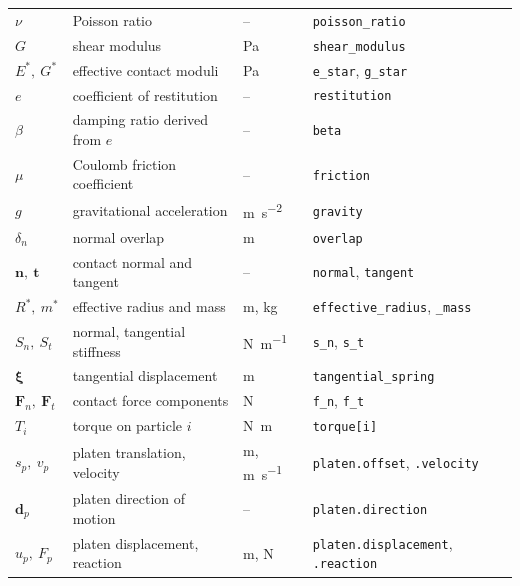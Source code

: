 \begin{table}[htbp]
\begin{tabular}{llll}
    $\nu$            & Poisson ratio                    & --                   & \texttt{poisson\_ratio} \\
    $G$              & shear modulus                    & \unit{\pascal}       & \texttt{shear\_modulus} \\
    $E^{*},\ G^{*}$  & effective contact moduli         & \unit{\pascal}       & \texttt{e\_star}, \texttt{g\_star} \\
    $e$              & coefficient of restitution       & --                   & \texttt{restitution} \\
    $\beta$          & damping ratio derived from $e$   & --                   & \texttt{beta} \\
    $\mu$            & Coulomb friction coefficient     & --                   & \texttt{friction} \\
    $g$              & gravitational acceleration       & \unit{\metre\per\second\squared} & \texttt{gravity} \\
    $\delta_{n}$     & normal overlap                   & \unit{\metre}        & \texttt{overlap} \\
    $\mathbf{n},\ \mathbf{t}$ & contact normal and tangent & --                 & \texttt{normal}, \texttt{tangent} \\
    $R^{*},\ m^{*}$  & effective radius and mass        & \unit{\metre}, \unit{\kilogram} & \texttt{effective\_radius}, \texttt{\_mass} \\
    $S_{n},\ S_{t}$  & normal, tangential stiffness     & \unit{\newton\per\metre} & \texttt{s\_n}, \texttt{s\_t} \\
    $\boldsymbol{\xi}$ & tangential displacement        & \unit{\metre}        & \texttt{tangential\_spring} \\
    $\mathbf{F}_{n},\ \mathbf{F}_{t}$ & contact force components & \unit{\newton} & \texttt{f\_n}, \texttt{f\_t} \\
    $T_{i}$          & torque on particle $i$           & \unit{\newton\metre} & \texttt{torque[i]} \\
    $s_{p},\ v_{p}$  & platen translation, velocity     & \unit{\metre}, \unit{\metre\per\second} & \texttt{platen.offset}, \texttt{.velocity} \\
    $\mathbf{d}_{p}$ & platen direction of motion       & --                   & \texttt{platen.direction} \\
    $u_{p},\ F_{p}$  & platen displacement, reaction    & \unit{\metre}, \unit{\newton} & \texttt{platen.displacement}, \texttt{.reaction} \\

\end{tabular}
\end{table}

